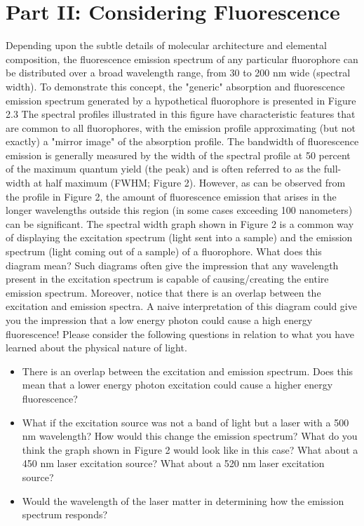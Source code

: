 \section*{Part II: Considering Fluorescence}
Depending upon the subtle details of molecular architecture and elemental composition, the fluorescence emission spectrum of any particular fluorophore can be distributed over a broad wavelength range, from 30 to 200 nm wide (spectral width). 
To demonstrate this concept, the "generic" absorption and fluorescence emission spectrum generated by a hypothetical fluorophore is presented in Figure 2.3 The spectral profiles illustrated in this figure have characteristic features that are common to all fluorophores, with the emission profile approximating (but not exactly) a "mirror image" of the absorption profile. 
The bandwidth of fluorescence emission is generally measured by the width of the spectral profile at 50 percent of the maximum quantum yield (the peak) and is often referred to as the full-width at half maximum (FWHM; Figure 2). 
However, as can be observed from the profile in Figure 2, the amount of fluorescence emission that arises in the longer wavelengths outside this region (in some cases exceeding 100 nanometers) can be significant. 
The spectral width graph shown in Figure 2 is a common way of displaying the excitation spectrum (light sent into a sample) and the emission spectrum (light coming out of a sample) of a fluorophore. 
What does this diagram mean? Such diagrams often give the impression that any wavelength present in the excitation spectrum is capable of causing/creating the entire emission spectrum. 
Moreover, notice that there is an overlap between the excitation and emission spectra. 
A naive interpretation of this diagram could give you the impression that a low energy photon could cause a high energy fluorescence! 
Please consider the following questions in relation to what you have learned about the physical nature of light.

\begin{itemize}
\item There is an overlap between the excitation and emission spectrum. Does this mean that a lower energy photon excitation could cause a higher energy fluorescence?
\item What if the excitation source was not a band of light but a laser with a 500 nm wavelength? How would this change the emission spectrum? What do you think the graph shown in Figure 2 would look like in this case? What about a 450 nm laser excitation source? What about a 520 nm laser excitation source?
\item Would the wavelength of the laser matter in determining how the emission spectrum responds?
\end{itemize}
